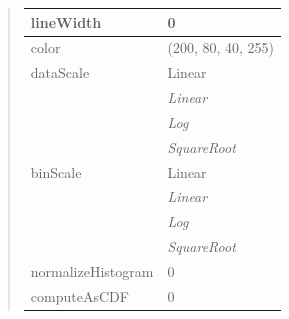 \documentclass[letterpaper,10pt,english]{sphinxmanual}
\begin{document}
\begin{quote}
\begin{longtable}{|l|l|}
\hline
lineWidth
 & 
0
\\
\hline
color
 & 
(200, 80, 40, 255)
\\
\hline
dataScale
 & 
Linear
\\
\hline & 
\emph{Linear}
\\
\hline & 
\emph{Log}
\\
\hline & 
\emph{SquareRoot}
\\
\hline
binScale
 & 
Linear
\\
\hline & 
\emph{Linear}
\\
\hline & 
\emph{Log}
\\
\hline & 
\emph{SquareRoot}
\\
\hline
normalizeHistogram
 & 
0
\\
\hline
computeAsCDF
 & 
0
\\
\hline\end{longtable}

\end{quote}

\begin{DUlineblock}{0em}
\item[] 
\end{DUlineblock}

\begin{DUlineblock}{0em}
\item[] 
\end{DUlineblock}
\end{document}
